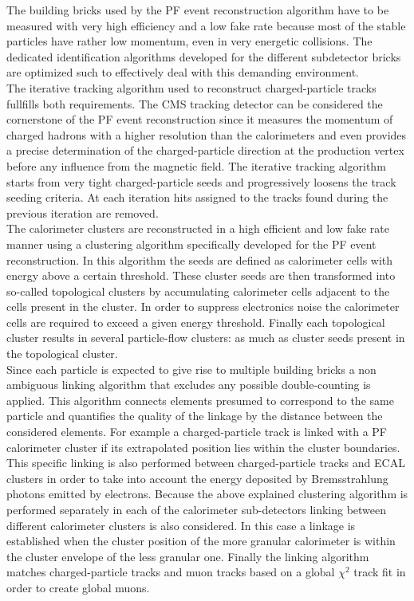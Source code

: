 The building bricks used by the PF event reconstruction algorithm have to be measured with very high efficiency and a low fake rate because most of the stable particles have rather low momentum, even in very energetic collisions.
The dedicated identification algorithms developed for the different subdetector bricks are optimized such to effectively deal with this demanding environment.
\\
The iterative tracking algorithm used to reconstruct charged-particle tracks fullfills both requirements. The CMS tracking detector can be considered the cornerstone of the PF event reconstruction since it measures the momentum of charged hadrons with a higher resolution than the calorimeters and even provides a precise determination of the charged-particle direction at the production vertex before any influence from the magnetic field. The iterative tracking algorithm starts from very tight charged-particle seeds and progressively loosens the track seeding criteria. At each iteration hits assigned to the tracks found during the previous iteration are removed.%
\\
The calorimeter clusters are reconstructed in a high efficient and low fake rate manner using a clustering algorithm specifically developed for the PF event reconstruction. In this algorithm the seeds are defined as calorimeter cells with energy above a certain threshold. These cluster seeds are then transformed into so-called topological clusters by accumulating calorimeter cells adjacent to the cells present in the cluster. In order to suppress electronics noise the calorimeter cells are required to exceed a given energy threshold. Finally each topological cluster results in several particle-flow clusters: as much as cluster seeds present in the topological cluster.
\\

Since each particle is expected to give rise to multiple building bricks a non ambiguous linking algorithm that excludes any possible double-counting is applied. This algorithm connects elements presumed to correspond to the same particle and quantifies the quality of the linkage by the distance between the considered elements. For example a charged-particle track is linked with a PF calorimeter cluster if its extrapolated position lies within the cluster boundaries. This specific linking is also performed between charged-particle tracks and ECAL clusters in order to take into account the energy deposited by Bremsstrahlung photons emitted by electrons. Because the above explained clustering algorithm is performed separately in each of the calorimeter sub-detectors linking between different calorimeter clusters is also considered. In this case a linkage is established when the cluster position of the more granular calorimeter is within the cluster envelope of the less granular one. Finally the linking algorithm matches charged-particle tracks and muon tracks based on a global $\chi^{2}$ track fit in order to create global muons. %

